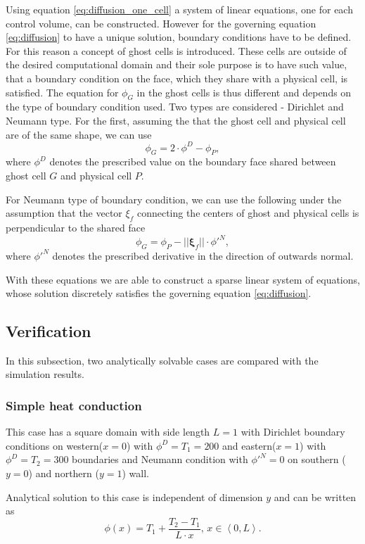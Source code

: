 \documentclass[]{article}
\begin{document}
Using equation \ref{eq:diffusion_one_cell} a system of linear equations, one for each control volume, can be constructed. However for the governing equation \ref{eq:diffusion} to have a unique solution, boundary conditions have to be defined. For this reason a concept of ghost cells is introduced. These cells are outside of the desired computational domain and their sole purpose is to have such value, that a boundary condition on the face, which they share with a physical cell, is satisfied. The equation for $ \phi_G $ in the ghost cells is thus different and depends on the type of boundary condition used. Two types are considered - Dirichlet and Neumann type. For the first, assuming the that the ghost cell and physical cell are of the same shape, we can use
\begin{equation}
\phi_G = 2\cdot \phi^D - \phi_P,
\end{equation}
where $ \phi^D $ denotes the prescribed value on the boundary face shared between ghost cell $ G $ and physical cell $ P $.

For Neumann type of boundary condition, we can use the following under the assumption that the vector $ \xi_f $ connecting the centers of ghost and physical cells is perpendicular to the shared face 
\begin{equation}
\phi_G = \phi_P - ||\boldsymbol{\xi}_f|| \cdot \phi'^N,
\end{equation}
where $ \phi'^N $ denotes the prescribed derivative in the direction of outwards normal.

With these equations we are able to construct a sparse linear system of equations, whose solution discretely satisfies the governing equation \ref{eq:diffusion}.

\subsection{Verification}
In this subsection, two analytically solvable cases are compared with the simulation results.
\subsubsection{Simple heat conduction}
This case has a square domain with side length $ L=1 $ with Dirichlet boundary conditions on western($ x=0 $) with $ \phi^D = T_1 = 200 $ and eastern($ x=1 $) with $ \phi^D = T_2 = 300 $ boundaries and Neumann condition with $ \phi'^N = 0 $ on southern ($ y=0 $) and northern ($ y=1 $) wall.

Analytical solution to this case is independent of dimension $ y $ and can be written as
\begin{equation}
\phi(x) = T_1 + \dfrac{T_2-T_1}{L \cdot x}, \, x \in \left<0,L\right>.
\end{equation}
\end{document}
